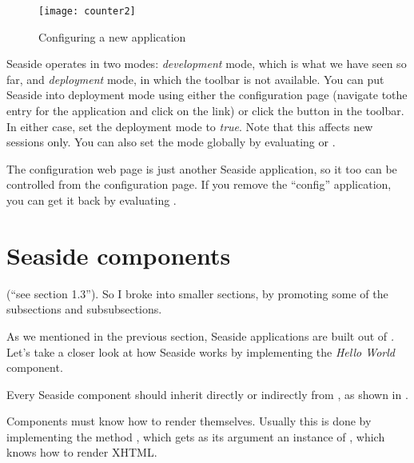 \documentclass[a4paper,10pt,twoside]{book}
\begin{document}
\begin{figure}[ht]
\begin{center}
\texttt{[image: counter2]}
\caption{Configuring a new application}
\end{center}
\end{figure}

Seaside operates in two modes: \emph{development} mode, which is what we have seen so
far, and \emph{deployment} mode, in which the toolbar is not available.
You can put Seaside into deployment mode using either the configuration page (navigate tothe entry for the application and click on the  link)
or click the  button in the toolbar.
In either case, set the deployment mode to \emph{true}.
Note that this affects new sessions only.
You can also set the mode globally by evaluating
 
or
.

The configuration web page is just another Seaside application, so it too can be
controlled from the configuration page.
If you remove the ``config'' application, you can get it back by evaluating
 .

\section{Seaside components}

(``see section 1.3''). So I broke into smaller sections, by promoting some of the
subsections and subsubsections.

As we mentioned in the previous section, Seaside applications are built out of
\emph{.}
Let's take a closer look at how Seaside works by implementing the \emph{Hello World}
component.

Every Seaside component should inherit directly or indirectly from ,
as shown in .


Components must know how to render themselves.
Usually this is done by implementing the method ,
which gets as its argument an instance of , which knows how to
render XHTML.
\end{document}

